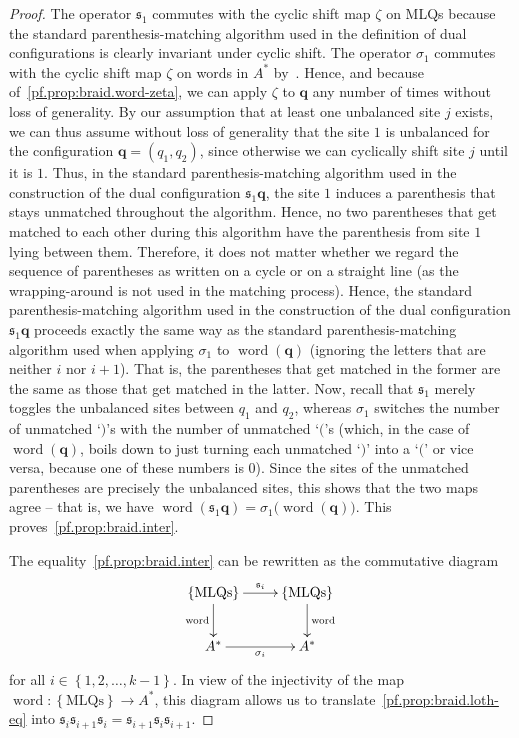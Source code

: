 \documentclass[reqno]{amsart}
\newcommand{\0}{\phantom{c}}
\DeclareMathOperator{\word}{word} %
\newcommand{\qq}{\mathbf{q}}
\newcommand{\fraks}{\mathfrak{s}}
\newcommand{\set}[1]{\left\{ #1 \right\}}
\theoremstyle{plain}
\theoremstyle{definition}
\numberwithin{equation}{section}
\begin{document}
\begin{proof}
The operator $\fraks_1$ commutes with the cyclic shift map $\zeta$ on MLQs because the standard parenthesis-matching algorithm used in the definition of dual configurations is clearly invariant under cyclic shift.
The operator $\sigma_1$ commutes with the cyclic shift map $\zeta$ on words in $A^*$ by~\cite[Prop.~5.6.1]{Loth}.
Hence, and because of~\eqref{pf.prop:braid.word-zeta}, we can apply $\zeta$ to $\qq$ any number of times without loss of generality.
By our assumption that at least one unbalanced site $j$ exists, we can thus assume without loss of generality that the site $1$ is unbalanced for the configuration $\qq = (q_1, q_2)$, since otherwise we can cyclically shift site $j$ until it is $1$.
Thus, in the standard parenthesis-matching algorithm used in the construction of the dual configuration $\fraks_1 \qq$, the site $1$ induces a parenthesis that stays unmatched throughout the algorithm.
Hence, no two parentheses that get matched to each other during this algorithm have the parenthesis from site $1$ lying between them.
Therefore, it does not matter whether we regard the sequence of parentheses as written on a cycle or on a straight line (as the wrapping-around is not used in the matching process).
Hence, the standard parenthesis-matching algorithm used in the construction of the dual configuration $\fraks_1 \qq$ proceeds exactly the same way as the standard parenthesis-matching algorithm used when applying $\sigma_1$ to $\word(\qq)$ (ignoring the letters that are neither $i$ nor $i+1$). That is, the parentheses that get matched in the former are the same as those that get matched in the latter.
Now, recall that $\fraks_1$ merely toggles the unbalanced sites between $q_1$ and $q_2$, whereas $\sigma_1$ switches the number of unmatched `$)$'s with the number of unmatched `$($'s (which, in the case of $\word(\qq)$, boils down to just turning each unmatched `$)$' into a `$($' or vice versa, because one of these numbers is $0$).
Since the sites of the unmatched parentheses are precisely the unbalanced sites, this shows that the two maps agree -- that is, we have $\word(\fraks_1 \qq) = \sigma_1\bigl( \word(\qq) \bigr)$.
This proves~\eqref{pf.prop:braid.inter}.

The equality~\eqref{pf.prop:braid.inter} can be rewritten as the
commutative diagram
\[
\xymatrix{
 \set{\text{MLQs}} \ar[r]^{\fraks_i} \ar[d]_{\word} & \set{\text{MLQs}} \ar[d]^{\word} \\
 A^* \ar[r]_{\sigma_i} & A^*
}
\]
for all $i \in \set{1, 2, \dotsc, k-1}$.
In view of the injectivity of the map $\word \colon \set{\text{MLQs}} \to A^*$,
this diagram allows us to translate~\eqref{pf.prop:braid.loth-eq} into
$\fraks_i \fraks_{i+1} \fraks_i = \fraks_{i+1} \fraks_i \fraks_{i+1}$.
\end{proof}
\end{document}
